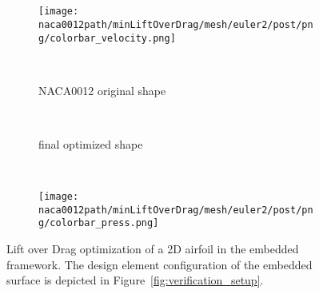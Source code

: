 \documentclass[../main.tex]{subfiles}
\def\naca0012path{/home/lukas/Desktop/project/independence/project/simulations/naca0012}
\begin{document}
\begin{figure}[t!]
    \centering
    	\begin{subfigure}[t]{0.45\textwidth}
    	    \setlength{\fboxsep}{\valfboxsep}%
        \setlength{\fboxrule}{\valfboxrule}%
		\end{subfigure}~
    	\begin{subfigure}[t]{0.45\textwidth}
    	    	\setlength{\fboxsep}{\valfboxsep}%
        \setlength{\fboxrule}{\valfboxrule}%
		\end{subfigure}~
    	\begin{subfigure}[t]{0.1\textwidth}
			  \texttt{[image: \\naca0012path/minLiftOverDrag/mesh/euler2/post/png/colorbar\_velocity.png]}
		\end{subfigure}\\
    	\begin{subfigure}[t]{0.45\textwidth}
    	    \setlength{\fboxsep}{\valfboxsep}%
        \setlength{\fboxrule}{\valfboxrule}%
			  \caption{NACA0012 original shape}
		\end{subfigure}~
    	\begin{subfigure}[t]{0.45\textwidth}
    	    \setlength{\fboxsep}{\valfboxsep}%
        \setlength{\fboxrule}{\valfboxrule}%
			  \caption{final optimized shape}
		\end{subfigure}~
    	\begin{subfigure}[t]{0.1\textwidth}
			  \texttt{[image: \\naca0012path/minLiftOverDrag/mesh/euler2/post/png/colorbar\_press.png]}
		\end{subfigure}
    \caption[NACA0012 LDR optimization - solution fields]{Lift over Drag optimization of a 2D airfoil in the embedded framework. The design element configuration of the embedded surface is depicted in Figure~\ref{fig:verification_setup}.}
    \label{fig:naca0012_ldr_solutions}
\end{figure}
\end{document}
